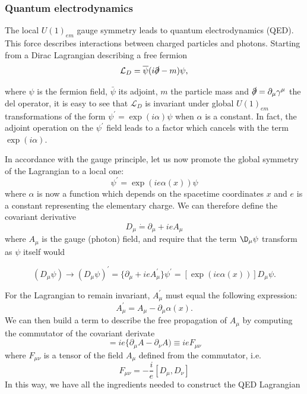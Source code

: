 \documentclass[10pt,a4paper]{book}
\begin{document}
\subsubsection{Quantum electrodynamics}
The local $U(1)_{em}$ gauge symmetry leads to quantum electrodynamics (QED). This force describes interactions between charged particles and photons. Starting from a Dirac Lagrangian describing a free fermion
\begin{equation}
\mathcal{L}_D = \overline{\psi}(i\slashed{\partial} - m )\psi,
\label{Dirac}
\end{equation}

where $\psi$ is the fermion field, $\bar{\psi}$ its adjoint, $m$ the particle mass and $\slashed{\partial} = \partial_\mu \gamma^\mu$ the del operator, it is easy to see that $\mathcal{L}_D$ is invariant under global $U(1)_{em}$ transformations of the form $\psi^\prime = \exp(i\alpha)\psi$ when $\alpha$ is a constant. In fact, the adjoint operation on the $\psi^\prime$ field leads to a factor which cancels with the term $\exp(i\alpha)$.

In accordance with the gauge principle, let us now promote the global symmetry of the Lagrangian to a local one:
\begin{equation}
    \psi^\prime = \exp(ie\alpha(x))\psi
\label{local qed}
\end{equation}
where $\alpha$ is now a function which depends on the spacetime coordinates $x$ and $e$ is a constant representing the elementary charge. We can therefore define the covariant derivative
\begin{equation}
    D_\mu \dot{=} \partial_\mu + ieA_\mu
\end{equation}
where $A_\mu$ is the gauge (photon) field, and require that the term $\D_\mu\psi$ transform as $\psi$ itself would

\begin{equation}
    (D_\mu\psi) \rightarrow (D_\mu\psi)^\prime = \{\partial_\mu + ieA_\mu^\prime\}\psi^\prime = [\exp(ie\alpha(x))]D_\mu\psi.
\end{equation}

For the Lagrangian to remain invariant, $A^\prime_\mu$ must equal the following expression:
\begin{equation}
    A^\prime_\mu = A_\mu - \partial_\mu\alpha(x).
\end{equation}
We can then build a term to describe the free propagation of $A_\mu$ by computing the commutator of the covariant derivate
\begin{equation}
    [D_\mu, D_\nu] = ie\{\partial_\mu A - \partial_\nu A) \equiv ieF_{\mu\nu}
\end{equation}
where $F_{\mu\nu}$ is a tensor of the field $A_\mu$ defined from the commutator, i.e.
\begin{equation}
    F_{\mu\nu} = -\frac{i}{e}[D_\mu, D_\nu]
\end{equation}
In this way, we have all the ingredients needed to construct the QED Lagrangian
\end{document}
